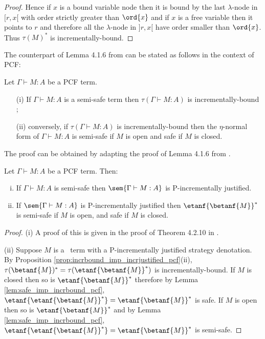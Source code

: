 \begin{proof}
Hence if $x$ is a bound variable node then it is bound by the
last $\lambda$-node in $[r,x[$ with order strictly greater than
$\ord{x}$ and if $x$ is a free variable then it points to $r$ and
therefore all the $\lambda$-node in $]r,x[$ have order smaller than
$\ord{x}$. Thus $\tau(M)^*$ is incrementally-bound.
\end{proof}

The counterpart of Lemma 4.1.6 from
\cite{blumtransfer} can be stated as follows in the context of PCF:
\begin{lemma}
\label{lem:safe_imp_incrbound_pcf} Let $\Gamma \vdash M : A$ be a PCF term.
\begin{itemize}
\item[(i)] If $\Gamma \vdash M : A$ is a semi-safe term then $\tau(\Gamma \vdash M : A)$ is incrementally-bound ;
\item[(ii)] conversely, if $\tau(\Gamma \vdash M : A)$ is incrementally-bound then the $\eta$-normal form of $\Gamma \vdash M : A$ is semi-safe if $M$ is open and safe if $M$ is closed.
\end{itemize}
\end{lemma}
The proof can be obtained by adapting the proof
of Lemma 4.1.6 from \cite{blumtransfer}.

\begin{theorem}
\label{thm:semisafeincrejust_pcf} Let $\Gamma \vdash M : A$ be a PCF term. Then:
\begin{enumerate}[(i)]
\item If $\Gamma \vdash M : A$ is semi-safe then $\sem{\Gamma \vdash M : A}$ is P-incrementally justified.
\item If $\sem{\Gamma \vdash M : A}$ is
  P-incrementally justified then $\etanf{\betanf{M}}^*$ is semi-safe  if $M$ is open, and safe if $M$ is closed.
\end{enumerate}
\end{theorem}

\begin{proof}
\noindent(i)
A proof of this is given in the proof of Theorem 4.2.10 in \cite{blumtransfer}.

\noindent(ii)
Suppose $M$ is a \pcf\ term with a P-incrementally justified strategy denotation. By Proposition \ref{prop:incrbound_imp_incrjustified_pcf}(ii), $\tau(\betanf{M})^* = \tau(\etanf{\betanf{M}}^*)$ is incrementally-bound.
If $M$ is closed then so is $\etanf{\betanf{M}}^*$ therefore by Lemma \ref{lem:safe_imp_incrbound_pcf}, $\etanf{\etanf{\betanf{M}}^*} = \etanf{\betanf{M}}^*$ is safe. If $M$ is open then so is $\etanf{\betanf{M}}^*$ and by Lemma \ref{lem:safe_imp_incrbound_pcf}, $\etanf{\etanf{\betanf{M}}^*} = \etanf{\betanf{M}}^*$ is semi-safe.
\end{proof}


